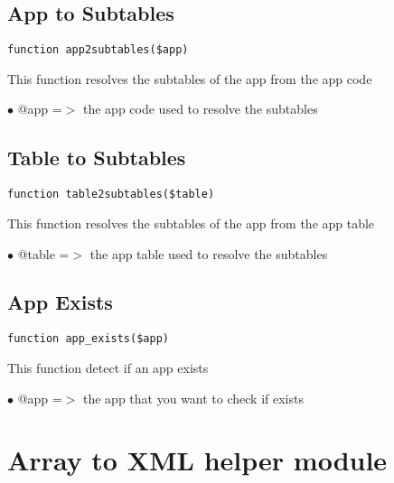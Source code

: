 \documentclass[a4paper]{book}
\begin{document}
\hypertarget{toc28}{}
\subsection{App to Subtables}

\begin{lstlisting}
function app2subtables($app)
\end{lstlisting}

This function resolves the subtables of the app from the app code

\begin{compactitem}
\item[\color{myblue}$\bullet$] @app =$>$ the app code used to resolve the subtables
\end{compactitem}

\hypertarget{toc29}{}
\subsection{Table to Subtables}

\begin{lstlisting}
function table2subtables($table)
\end{lstlisting}

This function resolves the subtables of the app from the app table

\begin{compactitem}
\item[\color{myblue}$\bullet$] @table =$>$ the app table used to resolve the subtables
\end{compactitem}

\hypertarget{toc30}{}
\subsection{App Exists}

\begin{lstlisting}
function app_exists($app)
\end{lstlisting}

This function detect if an app exists

\begin{compactitem}
\item[\color{myblue}$\bullet$] @app =$>$ the app that you want to check if exists
\end{compactitem}

\hypertarget{toc31}{}
\section{Array to XML helper module}
\end{document}
